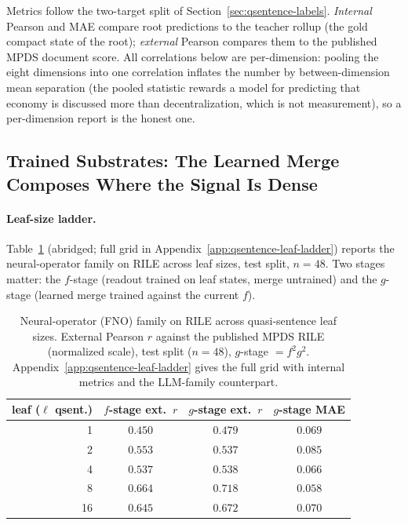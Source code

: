 Metrics follow the two-target split of
Section~\ref{sec:qsentence-labels}. \emph{Internal} Pearson and MAE
compare root predictions to the teacher rollup (the gold compact state
of the root); \emph{external} Pearson compares them to the published
MPDS document score. All correlations below are per-dimension:
pooling the eight dimensions into one correlation inflates the number
by between-dimension mean separation (the pooled statistic rewards a
model for predicting that economy is discussed more than
decentralization, which is not measurement), so a per-dimension
report is the honest one.

\subsection{Trained Substrates: The Learned Merge Composes Where the Signal Is Dense}\label{sec:qsentence-results}

\paragraph{Leaf-size ladder.} Table~\ref{tab:qsentence-fno-ladder}
(abridged; full grid in Appendix~\ref{app:qsentence-leaf-ladder})
reports the neural-operator family on RILE across leaf sizes, test
split, $n = 48$. Two stages matter: the $f$-stage (readout trained on
leaf states, merge untrained) and the $g$-stage (learned merge trained
against the current $f$).

\begin{table}[htbp]
    \centering
    \begin{tabular}{rccc}
    \toprule
    leaf ($\ell$ qsent.) & $f$-stage ext.\ $r$ & $g$-stage ext.\ $r$ & $g$-stage MAE \\
    \midrule
    1  & $0.450$ & $0.479$ & $0.069$ \\
    2  & $0.553$ & $0.537$ & $0.085$ \\
    4  & $0.537$ & $0.538$ & $0.066$ \\
    8  & $0.664$ & $\mathbf{0.718}$ & $0.058$ \\
    16 & $0.645$ & $0.672$ & $0.070$ \\
    \bottomrule
    \end{tabular}
    \caption{Neural-operator (FNO) family on RILE across quasi-sentence
    leaf sizes. External Pearson $r$ against the published MPDS RILE
    (normalized scale), test split ($n=48$), $g$-stage $= f^2g^2$.
    Appendix~\ref{app:qsentence-leaf-ladder} gives the full grid with
    internal metrics and the LLM-family counterpart.}
    \label{tab:qsentence-fno-ladder}
\end{table}

